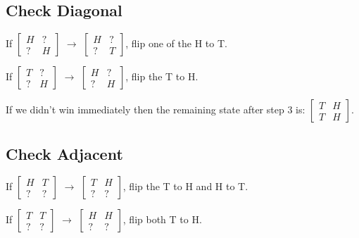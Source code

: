\documentclass{article}
\begin{document}
\subsection{Check Diagonal}

\begin{center}
If $\begin{bmatrix}
    H & ? \\
    ? & H 
\end{bmatrix}$ $\rightarrow$ $\begin{bmatrix}
    H & ? \\
    ? & T 
\end{bmatrix}$, flip one of the H to T.
\end{center}

\begin{center}
If $\begin{bmatrix}
    T & ? \\
    ? & H 
\end{bmatrix}$ $\rightarrow$ $\begin{bmatrix}
    H & ? \\
    ? & H 
\end{bmatrix}$, flip the T to H.
\end{center}

If we didn't win immediately then the remaining state after step 3 is:
$\begin{bmatrix} 
    T & H \\
    T & H 
\end{bmatrix}$.

\subsection{Check Adjacent}

\begin{center}
If $\begin{bmatrix}
    H & T \\
    ? & ? 
\end{bmatrix}$ $\rightarrow$ $\begin{bmatrix}
    T & H \\
    ? & ? 
\end{bmatrix}$, flip the T to H and H to T.
\end{center}

\begin{center}
If $\begin{bmatrix}
    T & T \\
    ? & ? 
\end{bmatrix}$ $\rightarrow$ $\begin{bmatrix}
    H & H \\
    ? & ? 
\end{bmatrix}$, flip both T to H.
\end{center}
\end{document}
